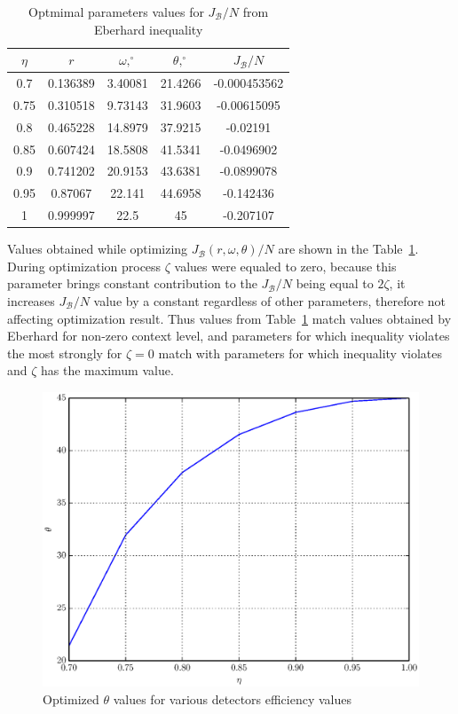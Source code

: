 \documentclass[11pt]{article}
\begin{document}
\begin{table}[h]
\centering
\begin{tabular}{|c|c|c|c|c|}
\hline
$\eta$ & $r$ & $\omega,^\circ$ & $\theta,^\circ$ & $J_{\mathcal{B}} / N$
\\\hline
0.7 & 0.136389 & 3.40081 & 21.4266 & -0.000453562\\\hline
0.75 & 0.310518 & 9.73143 & 31.9603 & -0.00615095\\\hline
0.8 & 0.465228 & 14.8979 & 37.9215 & -0.02191\\\hline
0.85 & 0.607424 & 18.5808 & 41.5341 & -0.0496902\\\hline
0.9 & 0.741202 & 20.9153 & 43.6381 & -0.0899078\\\hline
0.95 & 0.87067 & 22.141 & 44.6958 & -0.142436\\\hline
1 & 0.999997 & 22.5 & 45 & -0.207107\\\hline
\end{tabular}
\caption{Optmimal parameters values for $J_{\mathcal{B}} / N$ from Eberhard inequality}
\label{tab:Eberhard_repeat}
\end{table}

Values obtained while optimizing $J_{\mathcal{B}}(r, \omega, \theta) / N$ are shown in the 
Table~\ref{tab:Eberhard_repeat}. During optimization process  $\zeta$ values were equaled to zero, 
because this parameter brings constant contribution to the $J_{\mathcal{B}} / N$ being equal to 
$2\zeta$, it increases $J_{\mathcal{B}} / N$ value by a constant regardless of other parameters, 
therefore not affecting optimization result. Thus values from Table~\ref{tab:Eberhard_repeat} 
match values obtained by Eberhard for non-zero context level, and parameters for which inequality 
violates the most strongly for $\zeta = 0$ match with parameters for which inequality violates 
and $\zeta$ has the maximum value.

\begin{figure}[h]
\includegraphics[scale=0.7]{theta.eps}
\caption{Optimized $\theta$ values for various detectors efficiency values}
\label{fig:theta_opt}
\end{figure}
\end{document}
